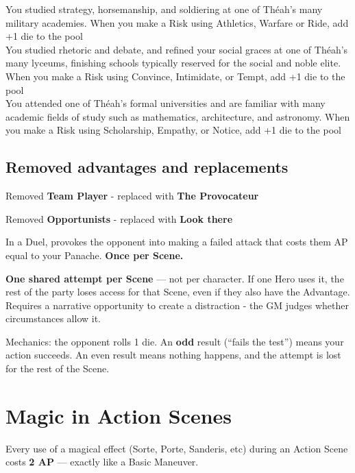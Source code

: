 \documentclass[10pt,twoside,openany]{book}
\begin{document}
	You studied strategy, horsemanship, and soldiering at
	one of Théah’s many military academies. When you
	make a Risk using Athletics, Warfare or Ride, add +1 die to the pool\\
	
	You studied rhetoric and debate, and refined your
	social graces at one of Théah’s many lyceums, finishing
	schools typically reserved for the social and noble elite.
	When you make a Risk using Convince, Intimidate, or
	Tempt, add +1 die to the pool\\
	
	You attended one of Théah’s formal universities and
	are familiar with many academic fields of study such
	as mathematics, architecture, and astronomy. When
	you make a Risk using Scholarship, Empathy, or
	Notice, add +1 die to the pool\\
	
	\subsection{Removed advantages and replacements}
	
	Removed \textbf{Team Player} - replaced with \textbf{The Provocateur}
	
	\noindent Removed \textbf{Opportunists} - replaced with \textbf{Look there}
	
	
	In a Duel, provokes the opponent into making a failed attack that costs them AP equal to your Panache. \textbf{Once per Scene.}	
	
	\textbf{One shared attempt per Scene} --- not per character. If one Hero uses it, the rest of the party loses access for that Scene, even if they also have the Advantage. Requires a narrative opportunity to create a distraction - the GM judges whether circumstances allow it.
	
	\vspace{1em}
	Mechanics: the opponent rolls 1 die. An \textbf{odd} result (``fails the test'') means your action succeeds. An even result means nothing happens, and the attempt is lost for the rest of the Scene.
	
	
	\section{Magic in Action Scenes}
	Every use of a magical effect (Sorte, Porte, Sanderis, etc) during an Action Scene costs \textbf{2 AP} --- exactly like a Basic Maneuver.
	
\end{document}
